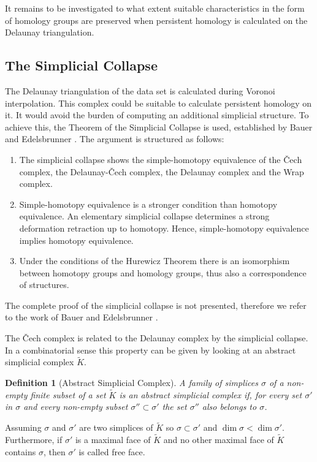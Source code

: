 \documentclass[journal]{IEEEtran}
\newtheorem{definition}{Definition}[section]
\begin{document}
It remains to be investigated to what extent suitable characteristics in the form of homology groups are preserved when persistent homology is calculated on the Delaunay triangulation.

\subsection{The Simplicial Collapse}
The Delaunay triangulation of the data set is calculated during Voronoi interpolation. This complex could be suitable to calculate persistent homology on it. It would avoid the burden of computing an additional simplicial structure. To achieve this, the Theorem of the Simplicial Collapse is used, established by Bauer and Edelsbrunner \cite{BauerE14}. The argument is structured as follows:
\begin{enumerate}
  \item The simplicial collapse shows the simple-homotopy equivalence of the \v{C}ech complex, the Delaunay-\v{C}ech complex, the Delaunay complex and the Wrap complex.
  \item Simple-homotopy equivalence is a stronger condition than homotopy equivalence. An elementary simplicial collapse determines a strong deformation retraction up to homotopy. Hence, simple-homotopy equivalence implies homotopy equivalence.
  \item Under the conditions of the Hurewicz Theorem there is an isomorphism between homotopy groups and homology groups, thus also a correspondence of structures.
\end{enumerate}

The complete proof of the simplicial collapse is not presented, therefore we refer to the work of Bauer and Edelsbrunner \cite{BauerE14}.

The \v{C}ech complex is related to the Delaunay complex by the simplicial collapse. In a combinatorial sense this property can be given by looking at an abstract simplicial complex $\tilde{K}$.

\begin{definition}[Abstract Simplicial Complex]
A family of simplices $\sigma$ of a non-empty finite subset of a set $\tilde{K}$ is an abstract simplicial complex if, for every set $\sigma'$ in $\sigma$ and every non-empty subset $\sigma'' \subset \sigma'$ the set $\sigma''$ also belongs to $\sigma$.
\end{definition}

Assuming $\sigma$ and $\sigma'$ are two simplices of $\tilde{K}$ so $\sigma \subset \sigma'$ and $\dim \sigma < \dim \sigma'$. Furthermore, if $\sigma'$ is a maximal face of $\tilde{K}$ and no other maximal face of $\tilde{K}$ contains $\sigma$, then $\sigma'$ is called free face.
\end{document}
